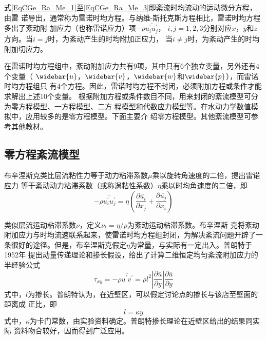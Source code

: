 式\eqref{EqCGe_Ra_Me_1}至\eqref{EqCGe_Ra_Me_3}即紊流时均流动的运动微分方程，由雷
诺导出，通常称为雷诺时均方程。与纳维-斯托克斯方程相比，雷诺时均方程多出了紊动附
加应力（也称雷诺应力）项$-\rho \overline{u^{\prime}_{i}u^{\prime}_{j}}$，
$i,j=1,2,3$分别对应$x$，$y$和$z$方向。当$i=j$时，为紊动产生的时均附加正应力，
当$i\neq j$时，为紊动产生的时均附加切应力。

在雷诺时均方程组中，紊动附加应力共有9项，其中只有6个独立变量，另外还有4个变量（
$\widebar{u}$，$\widebar{v}$，$\widebar{w}$和$\widebar{p}$），而雷诺时均方程组只
有4个方程。因此，雷诺时均方程不封闭，必须附加方程或条件才能求解出上述10个变量。
根据附加方程或条件数目不同，用来封闭的紊流模型可分为零方程模型、一方程模型、二方
程模型和代数应力模型等。在水动力学数值模拟中，应用较多的是零方程模型。下面主要介
绍零方程模型。其他紊流模型可参考其他教材。

\subsection{零方程紊流模型}
布辛涅斯克类比层流粘性力等于动力粘滞系数$\mu$乘以旋转角速度的二倍，提出雷诺应力
等于紊动动力粘滞系数（或称涡粘性系数）$\eta$乘以时均角速度的二倍，即
\begin{equation}
  -\rho \overline{u^{\prime}_{i}u^{\prime}_{j}}
  =
  \eta
  \left(
  \frac{\partial \overline{u_{i}}}{\partial x_{j}} +
  \frac{\partial \overline{u_{j}}}{\partial x_{i}}
  \right)
\end{equation}

类似层流运动粘滞系数$\nu$，定义$\nu_{t}=\eta/\rho$为紊动运动粘滞系数。布辛涅斯
克将紊动附加应力与时均流速联系起来，使雷诺时均方程组封闭，为解决紊流问题开辟了一
条很好的途径。但是，布辛涅斯克假定$\eta$为常量，与实际有一定出入。普朗特于1952年
提出动量传递理论和掺长假设，给出了计算二维恒定均匀紊流附加应力的半经验公式
\begin{equation}
  \tau_{xy}
  =
  -\rho \overline{u^{\prime}v^{\prime}}
  =
  \rho l^{2}
  \left|
  \frac{\partial \overline{u}}{\partial y}
  \right|
  \frac{\partial \overline{u}}{\partial y}
\end{equation}
式中，$l$为掺长。普朗特认为，在近壁区，可以假定讨论点的掺长与该店至壁面的距离成
正比，即
\begin{equation}
  l = \kappa y
\end{equation}
式中，$\kappa$为卡门常数，由实验资料确定。普朗特掺长理论在近壁区给出的结果同实际
资料吻合较好，因而得到广泛应用。

